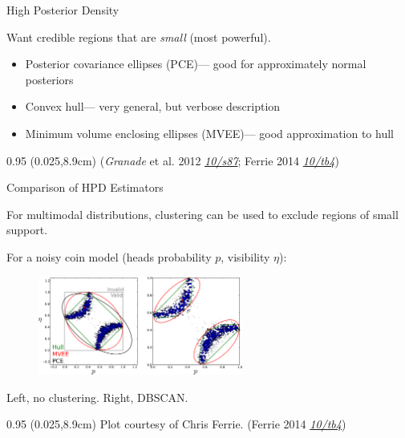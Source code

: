 \documentclass[xcolor=dvipsnames, compress]{beamer}
\renewcommand\UrlFont{\color{red}\rmfamily\itshape}
\newcommand{\shortdoi}[1]{\href{http://doi.org/#1}{\UrlFont 10/#1}}
\newcommand{\bottomnote}[1]{
  \begin{textblock*}{0.95\paperwidth} (0.025\paperwidth,8.9cm)
    {\tiny \hfill #1}
  \end{textblock*}
}
\begin{document}
\begin{frame}{High Posterior Density}

  Want credible regions that are \emph{small} (most powerful).

  \begin{itemize}
    \item Posterior covariance ellipses (PCE)--- good for approximately normal posteriors
    \item Convex hull--- very general, but verbose description
    \item Minimum volume enclosing ellipses (MVEE)--- good approximation to hull
  \end{itemize}

  \bottomnote{(\emph{Granade} et al. 2012 \shortdoi{s87}; Ferrie 2014 \shortdoi{tb4})}

\end{frame}

\begin{frame}{Comparison of HPD Estimators}

  For multimodal distributions, clustering can be used
  to exclude regions of small support.

  For a noisy coin model (heads probability $p$, visibility $\eta$):

  \begin{figure}
    \includegraphics[width=0.6\textwidth]{figures/hpd-clusters}
  \end{figure}

  Left, no clustering. Right, DBSCAN.

  \bottomnote{Plot courtesy of Chris Ferrie. (Ferrie 2014 \shortdoi{tb4})}

\end{frame}
\end{document}
